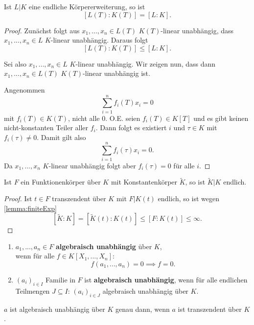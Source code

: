 \begin{lemma}\label{lemma:finiteExp}
    Ist $L|K$ eine endliche Körpererweiterung,
    so ist $$ [L(T):K(T)] = [L:K]. $$
\end{lemma}
\begin{proof}
    Zunächst folgt aus $x_1,...,x_n \in L(T)$ $K(T)$-linear unabhängig, dass
    $x_1,...,x_n \in L$ $K$-linear unabhängig. 
    Daraus folgt$$ [L(T):K(T)] \leq [L:K]. $$

    Sei also $x_1,...,x_n \in L$ $K$-linear unabhängig. Wir zeigen nun, dass dann
    $x_1,...,x_n \in L(T)$ $K(T)$-linear unabhängig ist.
    
    Angenommen $$ \sum\limits_{i=1}^n f_i(T)x_i = 0$$ mit $f_i(T) \in K(T)$, nicht alle 0.
    O.E. seien $f_i(T) \in K[T]$ und es gibt keinen nicht-konstanten Teiler aller $f_i$.
    Dann folgt es existiert $i$ und $\tau \in K$ mit $f_i(\tau) \neq 0$. 
    Damit gilt also $$ \sum\limits_{i=1}^n f_i(\tau)x_i = 0.$$
    Da $x_1,...,x_n$ $K$-linear unabhängig folgt aber $f_i(\tau) = 0$ für alle $i$.

\end{proof}

\begin{satz}
    Ist $F$ ein Funktionenkörper über $K$ mit Konstantenkörper $\tilde{K}$,
    so ist $\tilde{K}|K$ endlich.
\end{satz}
\begin{proof}
    Ist $t\in F$ transzendent über $K$ mit $F|K(t)$ endlich,
    so ist wegen \cref{lemma:finiteExp} 
    $$ [\tilde{K}:K] = [\tilde{K}(t):K(t)] \leq [F:K(t)] \leq \infty.$$
\end{proof}

\begin{definition}
    \begin{enumerate}[label=\arabic*)]
        \item $a_1,...,a_n \in F$ \textbf{algebraisch unabhängig} über $K$,\\
        wenn für alle $f \in K[X_1,...,X_n]$:
        $$ f(a_1,...,a_n) = 0 \implies f=0. $$

        \item $(a_i)_{i \in I}$ Familie in $F$ ist \textbf{algebraisch unabhängig},
        wenn für alle endlichen Teilmengen $J \subseteq I$:
        $ (a_i)_{i \in J}$ algebraisch unabhängig über $K$.
    \end{enumerate}
\end{definition}

\begin{beispiel}
    $a$ ist algebraisch unabhängig über $K$ genau dann, wenn $a$ ist transzendent über $K$.
\end{beispiel}

